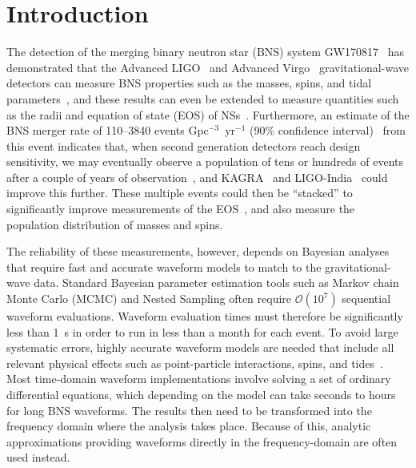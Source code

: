\documentclass[prd,aps,letter,twocolumn,floatfix,notitlepage,nofootinbib]{revtex4-1}
\begin{document}
\maketitle



\section{Introduction}

The detection of the merging binary neutron star (BNS) system GW170817~\cite{GW170817} has demonstrated that the Advanced LIGO~\cite{Harry2010} and Advanced Virgo~\cite{Acernese2009} gravitational-wave detectors can measure BNS properties such as the masses, spins, and tidal parameters~\cite{BNSPE}, and these results can even be extended to measure quantities such as the radii and equation of state (EOS) of NSs~\cite{RaithelOzelPsaltis2018, DeFinstadLattimer2018, EOSPaper}. Furthermore, an estimate of the BNS merger rate of 110--3840 events Gpc$^{-3}$~yr$^{-1}$ (90\% confidence interval)~\cite{O2Catalog} from this event indicates that, when second generation detectors reach design sensitivity, we may eventually observe a population of tens or hundreds of events after a couple of years of observation~\cite{LIGORate2010}, and KAGRA~\cite{Somiya2012} and LIGO-India~\cite{IyerSouradeepUnnikrishnan2011} could improve this further. These multiple events could then be ``stacked'' to significantly improve measurements of the EOS~\cite{DelPozzoLiAgathos2013, LackeyWade2015}, and also measure the population distribution of masses and spins. 

The reliability of these measurements, however, depends on Bayesian analyses that require fast and accurate waveform models to match to the gravitational-wave data. Standard Bayesian parameter estimation tools such as Markov chain Monte Carlo (MCMC) and Nested Sampling often require $\mathcal{O}(10^7)$ sequential waveform evaluations. Waveform evaluation times must therefore be significantly less than 1~s in order to run in less than a month for each event. To avoid large systematic errors, highly accurate waveform models are needed that include all relevant physical effects such as point-particle interactions, spins, and tides~\cite{Favata2014, YagiYunes2014, WadeCreightonOchsner2014}. Most time-domain waveform implementations involve solving a set of ordinary differential equations, which depending on the model can take seconds to hours for long BNS waveforms. The results then need to be transformed into the frequency domain where the analysis takes place. Because of this, analytic approximations providing waveforms directly in the frequency-domain  are often used instead. 
\end{document}
